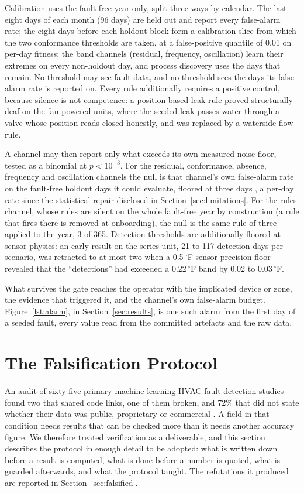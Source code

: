 \documentclass[11pt,letterpaper]{article}
\begin{document}
Calibration uses the fault-free year only, split three ways by calendar. The last eight days of each month (96 days) are held out and report every false-alarm rate; the eight days before each holdout block form a calibration slice from which the two conformance thresholds are taken, at a false-positive quantile of 0.01 on per-day fitness; the band channels (residual, frequency, oscillation) learn their extremes on every non-holdout day, and process discovery uses the days that remain. No threshold may see fault data, and no threshold sees the days its false-alarm rate is reported on. Every rule additionally requires a positive control, because silence is not competence: a position-based leak rule proved structurally deaf on the fan-powered units, where the seeded leak passes water through a valve whose position reads closed honestly, and was replaced by a waterside flow rule.

A channel may then report only what exceeds its own measured noise floor, tested as a binomial at $p<10^{-3}$. For the residual, conformance, absence, frequency and oscillation channels the null is that channel's own false-alarm rate on the fault-free holdout days it could evaluate, floored at three days \cite{hanley1983zeronumerators}, a per-day rate since the statistical repair disclosed in Section~\ref{sec:limitations}. For the rules channel, whose rules are silent on the whole fault-free year by construction (a rule that fires there is removed at onboarding), the null is the same rule of three applied to the year, 3 of 365. Detection thresholds are additionally floored at sensor physics: an early result on the series unit, 21 to 117 detection-days per scenario, was retracted to at most two when a 0.5\,$^\circ$F sensor-precision floor revealed that the ``detections'' had exceeded a 0.22\,$^\circ$F band by 0.02 to 0.03\,$^\circ$F.

What survives the gate reaches the operator with the implicated device or zone, the evidence that triggered it, and the channel's own false-alarm budget. Figure~\ref{lst:alarm}, in Section~\ref{sec:results}, is one such alarm from the first day of a seeded fault, every value read from the committed artefacts and the raw data.


\section{The Falsification Protocol}
\label{sec:protocol}

An audit of sixty-five primary machine-learning HVAC fault-detection studies found two that shared code links, one of them broken, and 72\% that did not state whether their data was public, proprietary or commercial \cite{mukhtar2025reproducibility}. A field in that condition needs results that can be checked more than it needs another accuracy figure. We therefore treated verification as a deliverable, and this section describes the protocol in enough detail to be adopted: what is written down before a result is computed, what is done before a number is quoted, what is guarded afterwards, and what the protocol taught. The refutations it produced are reported in Section~\ref{sec:falsified}.
\end{document}
